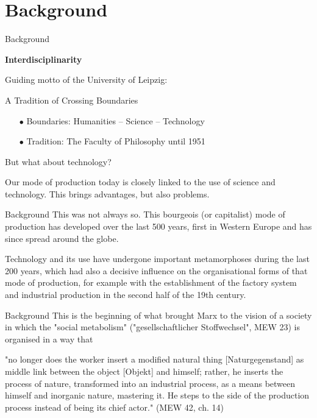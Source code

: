 \documentclass{beamer}
\title{Modelling Sustainable Systems\\ and Semantic Web\\[6pt] Introduction
  \vskip1em}
\subtitle{Lecture in the Module 10-202-2309\\ for Master Computer Science}
\author{Prof. Dr. Hans-Gert Gräbe\\
\url{http://www.informatik.uni-leipzig.de/~graebe}}
\date{October 2021}
\newcommand{\ueberschrift}[1]{\begin{center}\bf #1\end{center}}
\begin{document}
{
\begin{frame}
  \titlepage
\end{frame}}

\section{Background}
\begin{frame}{Background}

\ueberschrift{Interdisciplinarity}

Guiding motto of the University of Leipzig:
\begin{center}
  A Tradition of Crossing Boundaries
\end{center}

\begin{itemize}
\item[$\bullet$]  Boundaries: Humanities -- Science -- Technology
\item[$\bullet$]  Tradition: The Faculty of Philosophy until 1951
\end{itemize}

But what about technology?

Our mode of production today is closely linked to the use of science and
technology. This brings advantages, but also problems.
\end{frame}

\begin{frame}{Background}
This was not always so. This bourgeois (or capitalist) mode of production has
developed over the last 500 years, first in Western Europe and has since
spread around the globe.

Technology and its use have undergone important metamorphoses during the last
200 years, which had also a decisive influence on the organisational forms of
that mode of production, for example with the establishment of the factory
system and industrial production in the second half of the 19th century.
\end{frame}

\begin{frame}{Background}
This is the beginning of what brought Marx to the vision of a society in which
the "social metabolism" ("gesellschaftlicher Stoffwechsel", MEW 23) is
organised in a way that

"no longer does the worker insert a modified natural thing [Naturgegenstand] as
middle link between the object [Objekt] and himself; rather, he inserts the
process of nature, transformed into an industrial process, as a means between
himself and inorganic nature, mastering it. He steps to the side of the
production process instead of being its chief actor." (MEW 42, ch. 14)
\end{frame}
\end{document}
